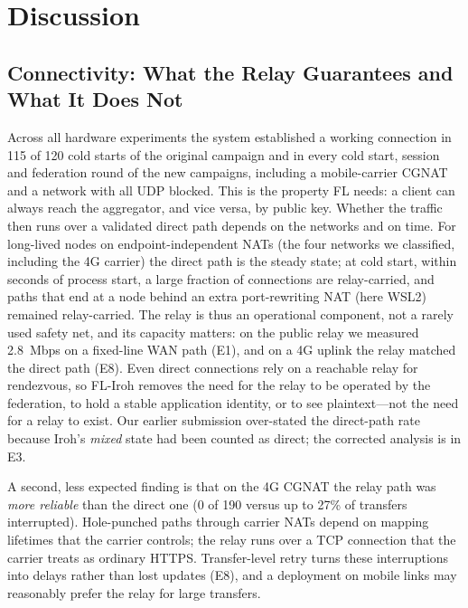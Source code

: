 \documentclass[a4paper,fleqn]{cas-dc}
\begin{document}
\section{Discussion}
\label{sec:discussion}

\subsection{Connectivity: What the Relay Guarantees and What It Does Not}

Across all hardware experiments the system established a working connection in 115 of 120 cold starts of the original campaign and in every cold start, session and federation round of the new campaigns, including a mobile-carrier CGNAT and a network with all UDP blocked. This is the property FL needs: a client can always reach the aggregator, and vice versa, by public key. Whether the traffic then runs over a validated direct path depends on the networks and on time. For long-lived nodes on endpoint-independent NATs (the four networks we classified, including the 4G carrier) the direct path is the steady state; at cold start, within seconds of process start, a large fraction of connections are relay-carried, and paths that end at a node behind an extra port-rewriting NAT (here WSL2) remained relay-carried. The relay is thus an operational component, not a rarely used safety net, and its capacity matters: on the public relay we measured 2.8~Mbps on a fixed-line WAN path (E1), and on a 4G uplink the relay matched the direct path (E8). Even direct connections rely on a reachable relay for rendezvous, so FL-Iroh removes the need for the relay to be operated by the federation, to hold a stable application identity, or to see plaintext---not the need for a relay to exist. Our earlier submission over-stated the direct-path rate because Iroh's \emph{mixed} state had been counted as direct; the corrected analysis is in E3.

A second, less expected finding is that on the 4G CGNAT the relay path was \emph{more reliable} than the direct one (0 of 190 versus up to 27\% of transfers interrupted). Hole-punched paths through carrier NATs depend on mapping lifetimes that the carrier controls; the relay runs over a TCP connection that the carrier treats as ordinary HTTPS. Transfer-level retry turns these interruptions into delays rather than lost updates (E8), and a deployment on mobile links may reasonably prefer the relay for large transfers.
\end{document}

